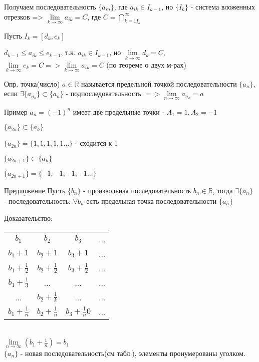 \documentclass[14pt,a4paper]{article}
\begin{document}
Получаем последовательность $\{ a_{in}\}$, где $a_{ik} \in I_{k-1}$, но $\{I_k\}$ - система вложенных отрезков => $\lim\limits_{k \rightarrow \infty} a_{ik} = C$, где $C=\bigcap\limits^{\infty}_{k=1 I_{k}}$

Пусть $I_k = [d_k, e_k]$

$d_{k-1} \le a_{ik} \le e_{k-1}$, т.к. $a_{ik} \in I_{k-1}$, но $\lim\limits_{k \rightarrow \infty} d_k = C$, $ \lim\limits_{k \rightarrow \infty} e_k = C => \lim\limits_{k \rightarrow \infty} a_{ik} = C$ (по теореме о двух м-рах)

Опр. точка(число) $a \in \mathbb{R}$ называется предельной точкой последовательности $\{a_n\}$, если $\exists \{a_{n_{k}}\} \subset \{a_n\}$ - подпоследовательность $=> \lim\limits_{n \rightarrow \infty} a_{n_{k}} = a$

Пример $a_n = (-1)^n$ имеет две предельные точки - $A_1=1, A_2=-1$

$\{a_{2n}\} \subset \{a_k\}$

$\{a_{2n}\} = \{1, 1, 1, 1, 1...\}$ - сходится к 1

$\{a_{2n+1}\} \subset  \{a_k\}$

$\{a_{2n+1}\} = \{-1, -1, -1, -1...\}$

$\underline{Предложение}$ Пусть $\{b_n\}$ - произвольная последовательность $b_n \in \mathbb{R}$, тогда $\exists \{a_n\}$ - последовательность: $\forall b_n$ есть предельная точка последовательности $\{a_n\}$

$\underline{Доказательство}$:

\begin{tabular}{|cccc|}
	$b_1$& $b_2$  & $b_3$ & ... \\
	$b_1+1$& $b_2+1$  & $b_3+1$ & ... \\
	$b_1+\frac 12$ & $b_2+\frac 12$  & $b_3+\frac 12$ & ... \\
	$b_1+\frac 13$& ...  & ...  & ...  \\
	...&$b_2+\frac 1k$  & ... & ... \\
	$b_1+\frac 1n$& $b_2+\frac 1n$  & $b_3+\frac 1n0$ & ... \\
\end{tabular}\\

$\lim\limits_{n \rightarrow \infty} (b_1 + \frac 1n) = b_1$ \\

$\{a_n\}$ - новая последовательность(см табл.), элементы пронумерованы уголком.
\end{document}
